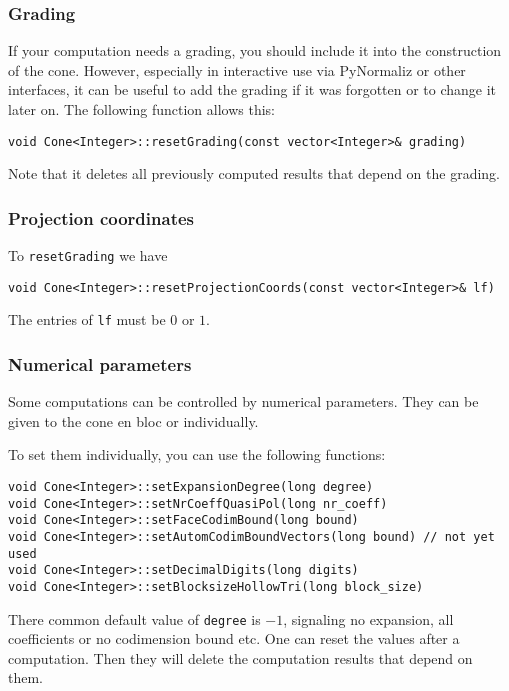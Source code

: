 \documentclass[12pt,a4paper]{scrartcl}
\theoremstyle{definition}
\begin{document}
\begin{small}
\subsubsection{Grading}

If your computation needs a grading, you should include it into the construction of the cone. However, especially in interactive use via PyNormaliz or other interfaces, it can be useful to add the grading if it was forgotten or to change it later on. The following function allows this:

\begin{Verbatim}
void Cone<Integer>::resetGrading(const vector<Integer>& grading)
\end{Verbatim}

Note that it deletes all previously computed results that depend on the grading.

\subsubsection{Projection coordinates}

To \verb|resetGrading| we have
\begin{Verbatim}
void Cone<Integer>::resetProjectionCoords(const vector<Integer>& lf)
\end{Verbatim}
The entries of \verb|lf| must be $0$ or $1$.

\subsubsection{Numerical parameters}

Some computations can be controlled by numerical parameters. They can be given to the cone en bloc or individually.

To set them individually, you can use the following functions:
\begin{Verbatim}
void Cone<Integer>::setExpansionDegree(long degree)
void Cone<Integer>::setNrCoeffQuasiPol(long nr_coeff)
void Cone<Integer>::setFaceCodimBound(long bound)
void Cone<Integer>::setAutomCodimBoundVectors(long bound) // not yet used
void Cone<Integer>::setDecimalDigits(long digits)
void Cone<Integer>::setBlocksizeHollowTri(long block_size)
\end{Verbatim}
There common default value of \verb|degree| is $-1$, signaling no expansion, all coefficients or no codimension bound etc. One can reset the values after a computation. Then they will delete the computation results that depend on them.


\end{small}
\end{document}
